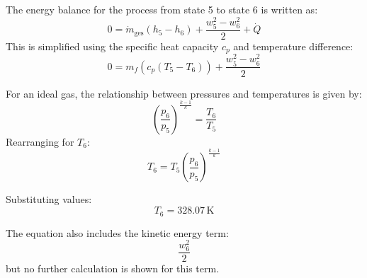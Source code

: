 The energy balance for the process from state 5 to state 6 is written as:  
\[
0 = \dot{m}_{\text{ges}} \left( h_5 - h_6 \right) + \frac{w_5^2 - w_6^2}{2} + \dot{Q}  
\]
This is simplified using the specific heat capacity \( c_p \) and temperature difference:  
\[
0 = m_f \left( c_p \left( T_5 - T_6 \right) \right) + \frac{w_5^2 - w_6^2}{2}  
\]

For an ideal gas, the relationship between pressures and temperatures is given by:  
\[
\left( \frac{p_6}{p_5} \right)^{\frac{k-1}{k}} = \frac{T_6}{T_5}  
\]
Rearranging for \( T_6 \):  
\[
T_6 = T_5 \left( \frac{p_6}{p_5} \right)^{\frac{k-1}{k}}  
\]

Substituting values:  
\[
T_6 = 328.07 \, \text{K}  
\]  

The equation also includes the kinetic energy term:  
\[
\frac{w_6^2}{2}  
\]  
but no further calculation is shown for this term.